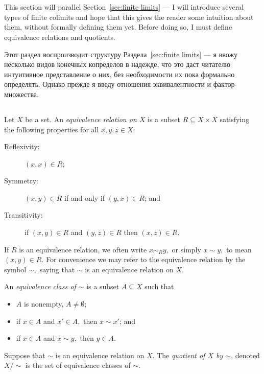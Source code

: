 \documentclass[../main/CT4S-EN-RU]{subfiles}
\begin{document}
\section{}\label{sec:finite colimits}

\begin{blockENG}
This section will parallel Section~\ref{sec:finite limits} — I will introduce several types of finite colimits and hope that this gives the reader some intuition about them, without formally defining them yet. Before doing so, I must define equivalence relations and quotients.
\end{blockENG}

\begin{blockRUS}
Этот раздел воспроизводит структуру Раздела~\ref{sec:finite limits} — я ввожу несколько видов конечных копределов в надежде, что это даст читателю интуитивное представление о них, без необходимости их пока формально определять. Однако прежде я введу отношения эквивалентности и фактор-множества.
\end{blockRUS}


\subsection{}

\begin{definitionENG}
Let $X$ be a set. An {\em equivalence relation on $X$} is a subset $R\subseteq X\times X$ satisfying the following properties for all $x,y,z\in X$:
\begin{description}
\item[Reflexivity:] $(x,x)\in R$;
\item[Symmetry:] $(x,y)\in R$ if and only if $(y,x)\in R$; and
\item[Transitivity:] if $(x,y)\in R$ and $(y,z)\in R$ then $(x,z)\in R.$
\end{description}
If $R$ is an equivalence relation, we often write $x\sim_R y,$ or simply $x\sim y,$ to mean $(x,y)\in R.$ For convenience we may refer to the equivalence relation by the symbol $\sim,$ saying that $\sim$ is an equivalence relation on $X.$

An {\em equivalence class of $\sim$} is a subset $A\subseteq X$ such that
\begin{itemize}
\item $A$ is nonempty, $A\neq\emptyset$;
\item if $x\in A$ and $x'\in A,$ then $x\sim x'$; and 
\item if $x\in A$ and $x\sim y,$ then $y\in A.$
\end{itemize}
Suppose that $\sim$ is an equivalence relation on $X.$ The {\em quotient of $X$ by $\sim$}, denoted $X/\sim$ is the set of equivalence classes of $\sim.$
\end{definitionENG}
\end{document}
